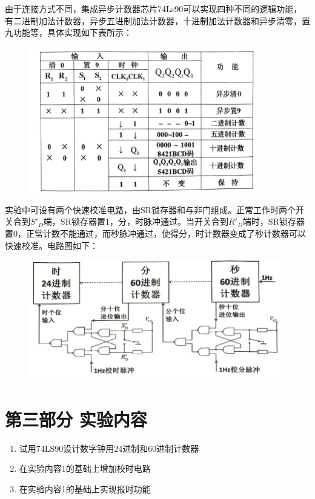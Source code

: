 \documentclass{ctexart}
\begin{document}
    由于连接方式不同，集成异步计数器芯片74Ls90可以实现四种不同的逻辑功能，有二进制加法计数器，异步五进制加法计数器，十进制加法计数器和异步清零，置九功能等，具体实现如下表所示：
    
    \begin{figure}[htbp]
        \centering
        \includegraphics[width=10cm]{2.2.png}
    \end{figure}

    实验中可设有两个快速校准电路，由SR锁存器和与非门组成。正常工作时两个开关合到$S'_D$端，SR锁存器置1，分，时脉冲通过。当开关合到$R'_D$端时，SR锁存器置0，正常计数不能通过，而秒脉冲通过，使得分，时计数器变成了秒计数器可以快速校准。电路图如下：
    
    \begin{figure}[htbp]
        \centering
        \includegraphics[width=\textwidth]{2.3.png}
    \end{figure}

    
    \section*{第三部分 \quad 实验内容}
    \begin{enumerate}
        \item 试用74LS90设计数字钟用24进制和60进制计数器
        \item 在实验内容1的基础上增加校时电路
        \item 在实验内容1的基础上实现报时功能
    \end{enumerate}
\end{document}
